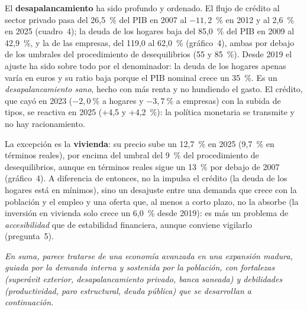 \begin{examen}
El \textbf{desapalancamiento} ha sido profundo y ordenado. El flujo de crédito al sector privado pasa del 26,5~\% del PIB en 2007 al $-11{,}2$~\% en 2012 y al 2,6~\% en 2025 (cuadro~4); la deuda de los hogares baja del 85,0~\% del PIB en 2009 al 42,9~\%, y la de las empresas, del 119,0 al 62,0~\% (gráfico~4), ambas por debajo de los umbrales del procedimiento de desequilibrios (55 y 85~\%). Desde 2019 el ajuste ha sido sobre todo por el denominador: la deuda de los hogares apenas varía en euros y su ratio baja porque el PIB nominal crece un 35~\%. Es un \emph{desapalancamiento sano}, hecho con más renta y no hundiendo el gasto. El crédito, que cayó en 2023 ($-2{,}0~\%$ a hogares y $-3{,}7~\%$ a empresas) con la subida de tipos, se reactiva en 2025 (+4,5 y +4,2~\%): la política monetaria se transmite y no hay racionamiento.

La excepción es la \textbf{vivienda}: su precio sube un 12,7~\% en 2025 (9,7~\% en términos reales), por encima del umbral del 9~\% del procedimiento de desequilibrios, aunque en términos reales sigue un 13~\% por debajo de 2007 (gráfico~4). A diferencia de entonces, no la impulsa el crédito (la deuda de los hogares está en mínimos), sino un desajuste entre una demanda que crece con la población y el empleo y una oferta que, al menos a corto plazo, no la absorbe (la inversión en vivienda solo crece un 6,0~\% desde 2019): es más un problema de \emph{accesibilidad} que de estabilidad financiera, aunque conviene vigilarlo (pregunta~5).

\textit{En suma, parece tratarse de una economía avanzada en una expansión madura, guiada por la demanda interna y sostenida por la población, con fortalezas (superávit exterior, desapalancamiento privado, banca saneada) y debilidades (productividad, paro estructural, deuda pública) que se desarrollan a continuación.}
\end{examen}


